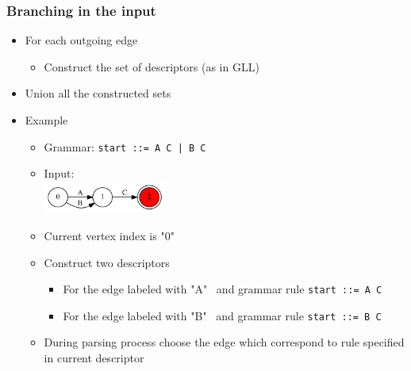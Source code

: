 \documentclass{beamer}
\begin{document}
\begin{frame}
  \transwipe[direction=90]
  \frametitle{Branching in the input}
  \begin{itemize}
    \item For each outgoing edge
    \begin{itemize}
      \item Construct the set of descriptors (as in GLL)
    \end{itemize}
    \item Union all the constructed sets
    \item Example
    \begin{itemize}
      \item Grammar: \texttt{start ::= A C | B C}
      \item Input: \\ \includegraphics[width=4cm]{pictures/InputGraph2}
      \item Current vertex index is "0"
      \item Construct two descriptors
      \begin{itemize}
          \item For the edge labeled with "A" \ and grammar rule \texttt{start ::= A C}
          \item For the edge labeled with "B" \ and grammar rule \texttt{start ::= B C}
      \end{itemize}
      \item During parsing process choose the edge which correspond to rule specified in current descriptor 
    \end{itemize} 
  \end{itemize}
\end{frame}
\end{document}
